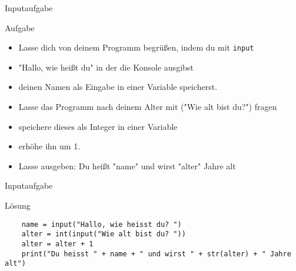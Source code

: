 \begin{frame}[fragile]{Inputaufgabe}   
\begin{block}{Aufgabe}
	\begin{itemize}
		\item Lasse dich von deinem Programm begrüßen, indem du mit \texttt{input} 
		\item "Hallo, wie heißt du" in der die Konsole ausgibst 
		\item deinen Namen als  
		Eingabe in einer Variable speicherst.
		\item Lasse das Programm nach deinem Alter mit ("Wie alt bist du?") fragen
		\item speichere dieses als Integer in einer Variable
		\item erhöhe ihn um 1.
		\item Lasse ausgeben: Du heißt "name" und wirst "alter" Jahre alt
	\end{itemize}
\end{block}
\end{frame}

\begin{frame}[fragile]{Inputaufgabe}
\begin{exampleblock}{Lösung}
	\begin{lstlisting}
	name = input("Hallo, wie heisst du? ")
	alter = int(input("Wie alt bist du? "))
	alter = alter + 1
	print("Du heisst " + name + " und wirst " + str(alter) + " Jahre alt")
	\end{lstlisting}
\end{exampleblock}
\end{frame}
